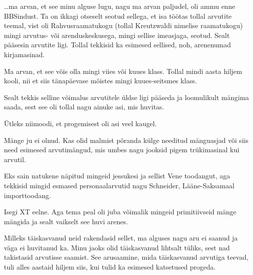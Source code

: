
                 
\ldots ma arvan, et see minu alguse lugu, nagu ma arvan paljudel, oli ammu enne BBSindust. Ta on ikkagi otseselt  seotud sellega, et isa töötas tollal arvutite teemal, vist oli Rahvusraamatukogu (tollal  Kreutzwaldi nimelise raamatukogu) mingi arvutus- või arenduskeskusega, mingi sellise imeasjaga, seotud. Sealt pääsesin arvutite ligi. Tollal tekkisid ka esimesed sellised, noh, arenenumad kirjamasinad. 


Ma arvan, et see võis olla mingi viies või kuues klass. Tollal mindi aasta hiljem kooli, nii et siis tänapäevase mõistes mingi kuues-seitsmes klass. 

Sealt tekkis selline võimalus arvutitele üldse ligi pääseda ja loomulikult mängima saada, sest see oli tollal nagu ainuke asi, mis huvitas.


Ütleks niimoodi, et progemisest oli asi veel kaugel.

Mänge ju ei olnud. Kas olid malmist põranda külge needitud mänguasjad või siis need esimesed arvutimängud, mis  umbes nagu jooksid pigem trükimasinal kui arvutil. 


Eks sain natukene näpitud mingeid jessukesi ja sellist Vene toodangut, aga tekkisid mingid esmased personaalarvutid nagu Schneider, Lääne-Saksamaal importtoodang.


Isegi XT eelne. Aga tema peal oli juba võimalik  mingeid primitiivseid mänge mängida ja sealt vaikselt  see huvi arenes. 


Milleks täiskasvanud neid rakendasid sellet,  ma alguses nagu aru ei saanud ja väga ei huvitanud ka. Minu jaoks olid täiskasvanud lihtsalt tüliks, sest nad takistasid arvutisse saamist. See arusaamine, mida täiskasvanud arvutiga teevad,  tuli alles  aastaid hiljem siis, kui tulid ka esimesed katsetused progeda.

